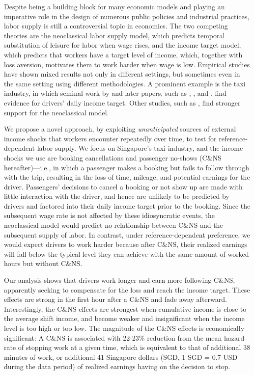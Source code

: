 \documentclass[reviewmode,AEJ]{AEA}
\begin{document}
\label{sec:intro}
Despite being a building block for many economic models and playing an imperative role in the 
design of numerous public policies and industrial practices, labor supply is still a controversial 
topic in economics. The two competing theories are the neoclassical labor supply model, which 
predicts temporal substitution of leisure for labor when wage rises, and the income target model, 
which predicts that workers have a target level of income, which, together with loss aversion, 
motivates them to work harder when wage is low. Empirical studies have shown mixed results not 
only in different settings, but sometimes even in the same setting using different methodologies.
A prominent example is the taxi industry, in which seminal work by \citet{camerer1997labor} and 
later papers, such as \citet{crawford2011new}, \citet{martin2017quit}, and \citet{thakral2018daily}, 
find evidence for drivers' daily income target. Other studies, such as 
\citet{farber2005tomorrow,farber2015you}, find stronger support for the neoclassical model.


We propose a novel approach, by exploiting \textit{unanticipated} sources of external 
income shocks that workers encounter repeatedly over time, to test for reference-dependent labor supply.
We focus on Singapore's taxi industry, and the income shocks we use are 
booking cancellations and passenger no-shows (C\&NS hereafter)---i.e., in which a passenger makes a booking but fails 
to follow through with the trip, resulting in the loss of time, mileage, and potential earnings
for the driver. Passengers' decisions to cancel a booking or not show up are made with 
little interaction with the driver, and hence are unlikely to be predicted by drivers and factored 
into their daily income target prior to the booking. Since the subsequent wage rate is not affected 
by these idiosyncratic events, the neoclassical model would predict no relationship between C\&NS and the subsequent supply of labor. In contrast, under reference-dependent 
preference, we would expect drivers to work harder because after C\&NS, their realized earnings will fall 
below the typical level they can achieve with the same amount of worked hours but without C\&NS. 

Our analysis shows that drivers work longer and earn more following 
C\&NS, apparently seeking to compensate for the loss and reach the income target. 
These effects are strong in the first hour after a 
C\&NS and fade away afterward. Interestingly, the C\&NS effects are strongest when cumulative income 
is close to the average shift income, and become weaker and insignificant when the income 
level is too high or too low. 
The magnitude of the C\&NS effects is economically significant: A C\&NS
is associated with 22-23\% reduction from the mean hazard rate of stopping work at a given time, %
which is equivalent to that of additional 38 minutes of work, or additional 41 Singapore dollars 
(SGD, 1 SGD = 0.7 USD during the data period) of realized earnings having on the decision to stop.
\end{document}
